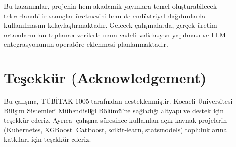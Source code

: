 \documentclass[12pt,a4paper]{article}
\begin{document}
Bu kazanımlar, projenin hem akademik yayınlara temel oluşturabilecek tekrarlanabilir sonuçlar üretmesini hem de endüstriyel dağıtımlarda kullanılmasını kolaylaştırmaktadır. Gelecek çalışmalarda, gerçek üretim ortamlarından toplanan verilerle uzun vadeli validasyon yapılması ve LLM entegrasyonunun operatöre eklenmesi planlanmaktadır.

\section*{Teşekkür (Acknowledgement)}

Bu çalışma, TÜBİTAK 1005 tarafından desteklenmiştir. Kocaeli Üniversitesi Bilişim Sistemleri Mühendisliği Bölümü'ne sağladığı altyapı ve destek için teşekkür ederiz. Ayrıca, çalışma süresince kullanılan açık kaynak projelerin (Kubernetes, XGBoost, CatBoost, scikit-learn, statsmodels) topluluklarına katkıları için teşekkür ederiz.
\end{document}
